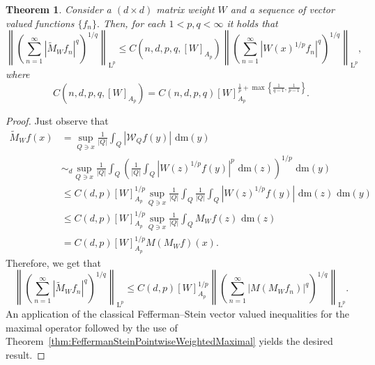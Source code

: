 \documentclass{article}
\newtheorem{theorem}{Theorem}
\theoremstyle{definition}
\theoremstyle{remark}
\numberwithin{equation}{section}
\newcommand{\norm}[2]{\left\|{#1}\right\|_{{#2}}}
\newcommand{\mathdm}{\,\mathrm{dm}}
\newcommand{\cW}{\mathcal{W}}
\newcommand{\Lp}[1]{\mathrm{L}^{#1}}
\newcommand{\1}{\mathbf{1}}
\begin{document}
    \begin{theorem}
        \label{thm:FeffermanSteinReducingWeightedMaximal}
        Consider a $(d \times d)$ matrix weight $W$ and a sequence of vector valued functions $\{f_n\}.$
        Then, for each $1 < p,q < \infty$ it holds that
        \begin{equation*}
            \norm{\left(\sum_{n=1}^\infty |\widetilde{M}_W f_n|^q\right)^{1/q}}{\Lp{p}}
            \leq C(n,d,p,q,[W]_{A_p}) \norm{\left(\sum_{n=1}^\infty |W(x)^{1/p} f_n|^q\right)^{1/q}}{\Lp{p}},
        \end{equation*}
        where
        \begin{equation*}
            C(n,d,p,q,[W]_{A_p}) = C(n,d,p,q) [W]_{A_p}^{\frac{1}{p} + \max\left\{\frac{1}{q-1},\frac{1}{p-1}\right\}}.
        \end{equation*}
    \end{theorem}
    \begin{proof}
        Just observe that
        \begin{equation*}
            \begin{split}
                \widetilde{M}_W f(x) &= \sup_{Q\ni x} \frac{1}{|Q|} \int_Q |\cW_Q f(y)|\, \mathdm(y)\\
                &\sim_d \sup_{Q\ni x} \frac{1}{|Q|} \int_Q \left( \frac{1}{|Q|} \int_Q |W(z)^{1/p} f(y)|^p\, \mathdm(z)\right)^{1/p}\, \mathdm(y)\\
                &\leq C(d,p)[W]_{A_p}^{1/p} \sup_{Q\ni x} \frac{1}{|Q|} \int_Q \frac{1}{|Q|} \int_Q |W(z)^{1/p} f(y)|\, \mathdm(z)\, \mathdm(y)\\
                &\leq C(d,p)[W]_{A_p}^{1/p} \sup_{Q\ni x} \frac{1}{|Q|} \int_Q M_W f(z)\, \mathdm(z)\\
                &= C(d,p)[W]_{A_p}^{1/p} M(M_W f) (x).
            \end{split}
        \end{equation*}
        Therefore, we get that
        \begin{equation*}
                \norm{\left(\sum_{n=1}^\infty |\widetilde{M}_W f_n|^q\right)^{1/q}}{\Lp{p}}
            \leq C(d,p) [W]_{A_p}^{1/p} \norm{\left(\sum_{n=1}^\infty |M(M_W f_n)|^q\right)^{1/q}}{\Lp{p}}.
        \end{equation*}
        An application of the classical Fefferman--Stein vector valued inequalities for the maximal operator
        followed by the use of Theorem~\ref{thm:FeffermanSteinPointwiseWeightedMaximal}
        yields the desired result.
    \end{proof}
\end{document}
